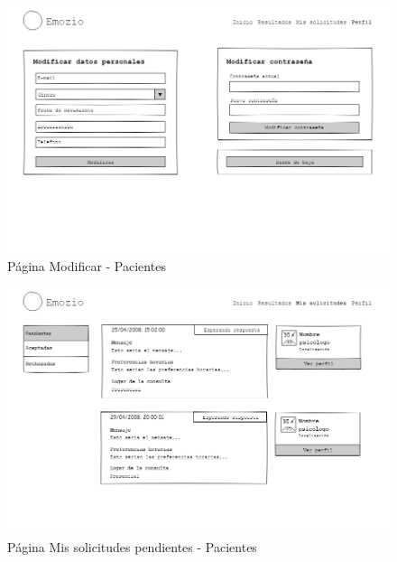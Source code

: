 \begin{figure}[htbp] 
    \centering
    \includegraphics[width=1\textwidth]{figuras/mockup_pacientes/modificar.png}
    \caption{Página Modificar - Pacientes}
\end{figure}	

\begin{figure}[htbp] 
    \centering
    \includegraphics[width=1\textwidth]{figuras/mockup_pacientes/mailpendientes.png}
    \caption{Página Mis solicitudes pendientes - Pacientes}
\end{figure}	

